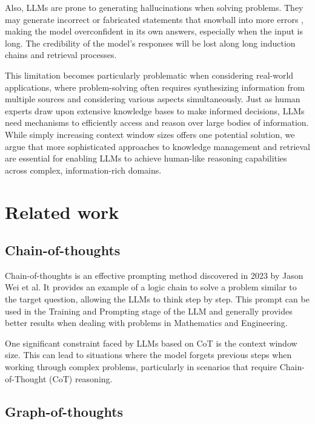 \documentclass{article}
\begin{document}
Also, LLMs are prone to generating hallucinations when solving problems. They may generate incorrect or fabricated statements that snowball into more errors \cite{zhang2023languagemodelhallucinationssnowball}, making the model overconfident in its own answers, especially when the input is long. The credibility of the model's responses will be lost along long induction chains and retrieval processes.

This limitation becomes particularly problematic when considering real-world applications, where problem-solving often requires synthesizing information from multiple sources and considering various aspects simultaneously. Just as human experts draw upon extensive knowledge bases to make informed decisions, LLMs need mechanisms to efficiently access and reason over large bodies of information. While simply increasing context window sizes offers one potential solution, we argue that more sophisticated approaches to knowledge management and retrieval are essential for enabling LLMs to achieve human-like reasoning capabilities across complex, information-rich domains.

\section{Related work}

\subsection{Chain-of-thoughts}

Chain-of-thoughts \cite{Wei2022ChainOT} is an effective prompting method discovered in 2023 by Jason Wei et al. It provides an example of a logic chain to solve a problem similar to the target question, allowing the LLMs to think step by step. This prompt can be used in the Training and Prompting stage of the LLM and generally provides better results when dealing with problems in Mathematics and Engineering.

One significant constraint faced by LLMs based on CoT is the context window size. This can lead to situations where the model forgets previous steps when working through complex problems, particularly in scenarios that require Chain-of-Thought (CoT) reasoning.

\subsection{Graph-of-thoughts}
\end{document}
